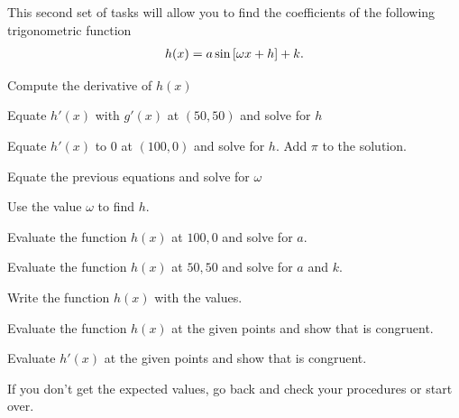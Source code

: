 \documentclass[11pt, a4paper, oneside]{article}
\begin{document}
    This second set of tasks will allow you to find the coefficients of the following trigonometric function
    \begin{gather*}
        h(x) = a\sin\qty[\omega x +h] + k.
    \end{gather*}

    Compute the derivative of \(h(x)\)

    \boxarea[2cm]

    Equate \(h'(x)\) with \(g'(x)\) at \((50,50)\) and solve for $h$

    \boxarea[2cm]

    Equate \(h'(x)\) to \(0\) at \((100,0)\) and solve for $h$. 
    Add \(\pi\) to the solution.

    \boxarea[2cm]

    Equate the previous equations and solve for \(\omega\) 

    \boxarea[2cm]

    Use the value \(\omega\) to find \(h\).

    \boxarea[2cm]

    Evaluate the function \(h(x)\) at \(100,0\) and solve for \(a\).
    
    \boxarea[2cm]

    Evaluate the function \(h(x)\) at \(50,50\) and solve for \(a\) and \(k\).
    
    \boxarea[2cm]

    Write the function \(h(x)\) with the values.    
    
    \boxarea[2cm]

    Evaluate the function \(h(x)\) at the given points and show that is congruent.
    
    \boxarea[2cm]

    Evaluate \(h'(x)\) at the given points and show that is congruent.
    
    \boxarea[2cm]

    If you don't get the expected values, go back and check your procedures or start over.
\end{document}
